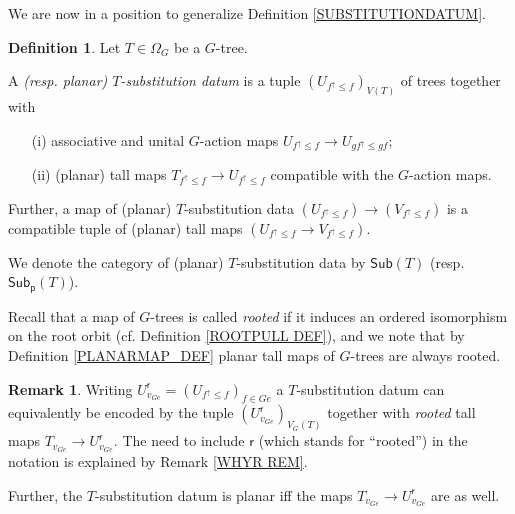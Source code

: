 \documentclass[a4paper,10pt
,draft
]{article}%
\numberwithin{equation}{section}
\numberwithin{figure}{section}
\theoremstyle{definition} %
\newtheorem{definition}[equation]{Definition}%
\newtheorem{remark}[equation]{Remark}%
\newcommand{\1}{\ensuremath{\mathbbm 1}}%
\begin{document}
We are now in a position to generalize 
Definition \ref{SUBSTITUTIONDATUM}.

\begin{definition}\label{SUBSTITUTIONDATUMG DEF}
	Let $T \in \Omega_G$ be a $G$-tree.
	
	A \textit{(resp. planar) $T$-substitution datum} is a tuple 
	$\left(U_{f^{\uparrow} \leq f} \right)_{V(T)}$ of trees together with
\begin{itemize}	
\item[(i)] associative and unital $G$-action maps
$U_{f^{\uparrow} \leq f} \to U_{g f^{\uparrow} \leq g f}$; 
\item[(ii)]	(planar) tall maps 
	$T_{f^{\uparrow} \leq f} \to U_{f^{\uparrow} \leq f}$ compatible with the $G$-action maps.
\end{itemize}	
	Further, a map of (planar) $T$-substitution data 
	$\left(U_{f^{\uparrow} \leq f}\right) \to
	\left(V_{f^{\uparrow} \leq f}\right)$ is a compatible tuple of (planar) tall maps 
	$\left(U_{f^{\uparrow} \leq f} \to V_{f^{\uparrow} \leq f} \right)$.
	
	We denote the category of (planar) $T$-substitution data 
	by $\mathsf{Sub}(T)$
	(resp. $\mathsf{Sub}_{\mathsf{p}}(T)$).
\end{definition}


Recall that a map of $G$-trees is called 
\textit{rooted} if it induces an ordered isomorphism on the root orbit (cf. Definition \ref{ROOTPULL DEF}),
and we note that by Definition \ref{PLANARMAP_DEF} planar tall maps of $G$-trees are always rooted.

\begin{remark}\label{SUBSGREF DEF}
Writing $U^{\mathsf{r}}_{v_{G e}} = (U_{f^{\uparrow} \leq f})_{f \in Ge}$
a $T$-substitution datum can equivalently be encoded by the tuple
$\left(U^{\mathsf{r}}_{v_{G e}}\right)_{V_G(T)}$ together with \textit{rooted} tall maps 
$T_{v_{Ge}} \to U^{\mathsf{r}}_{v_{G e}}$.
The need to include $\mathsf{r}$ (which stands for ``rooted'')
in the notation is explained by Remark \ref{WHYR REM}.

Further, the $T$-substitution datum is planar iff the maps $T_{v_{Ge}} \to U^{\mathsf{r}}_{v_{G e}}$ are as well.
\end{remark}
\end{document}
